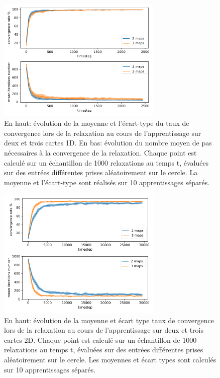 \documentclass[../main]{subfiles}
\begin{document}
\begin{figure}
\centering
\includegraphics[width=0.7\textwidth]{1D_conv_evolution_total.pdf}
\caption{En haut: évolution de la moyenne et l'écart-type du taux de convergence lors de la relaxation au cours de l'apprentissage sur deux et trois cartes 1D. En bas: évolution du nombre moyen de pas nécessaires à la convergence de la relaxation.
Chaque point est calculé sur un échantillon de 1000 relaxations au temps t, évaluées sur des entrées différentes prises aléatoirement sur le cercle. La moyenne et l'écart-type sont réalisés sur 10 apprentissages séparés.}
\label{fig:conv_evolution}
\end{figure}


\begin{figure}
\centering
\includegraphics[width=0.7\textwidth]{2D_conv_evolution_total.pdf}
\caption{En haut: évolution de la moyenne et écart type taux de convergence lors de la relaxation au cours de l'apprentissage sur deux et trois cartes 2D. Chaque point est calculé sur un échantillon de 1000 relaxations au temps t, évaluées sur des entrées différentes prises aléatoirement sur le cercle. Les moyennes et écart types sont calculés sur 10 apprentissages séparés.}
\label{fig:conv_evolution2D}
\end{figure}
\end{document}

